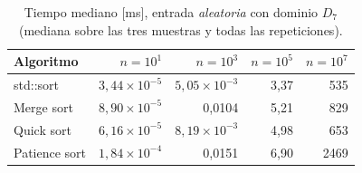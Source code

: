 %
\begin{table}[H]
\centering
\small
\caption{Tiempo mediano [ms], entrada \emph{aleatoria} con dominio $D_7$ (mediana sobre las tres muestras y todas las repeticiones).}
\label{tab:sorting-time}
\begin{tabular}{lrrrr}
\hline\hline
Algoritmo & $n=10^{1}$ & $n=10^{3}$ & $n=10^{5}$ & $n=10^{7}$ \\
\hline
std::sort & $3{,}44\times 10^{-5}$ & $5{,}05\times 10^{-3}$ & 3{,}37 & 535 \\
Merge sort & $8{,}90\times 10^{-5}$ & 0{,}0104 & 5{,}21 & 829 \\
Quick sort & $6{,}16\times 10^{-5}$ & $8{,}19\times 10^{-3}$ & 4{,}98 & 653 \\
Patience sort & $1{,}84\times 10^{-4}$ & 0{,}0151 & 6{,}90 & 2469 \\
\hline\hline
\end{tabular}
\end{table}
